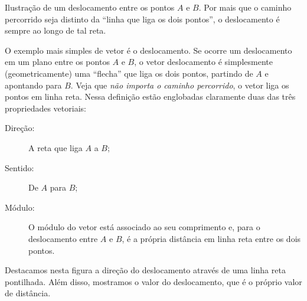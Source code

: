 \begin{marginfigure}
\centering
{}
\caption{Ilustração de um deslocamento entre os pontos $A$ e $B$. Por mais que o caminho percorrido seja distinto da ``linha que liga os dois pontos'', o deslocamento é sempre ao longo de tal reta.}
\end{marginfigure}

O exemplo mais simples de vetor é o deslocamento. Se ocorre um deslocamento em um plano entre os pontos $A$ e $B$, o vetor deslocamento é simplesmente (geometricamente) uma ``flecha'' que liga os dois pontos, partindo de $A$ e apontando para $B$. Veja que \emph{não importa o caminho percorrido}, o vetor liga os pontos em linha reta. Nessa definição estão englobadas claramente duas das três propriedades vetoriais:
\begin{description}
    \item[Direção:] A reta que liga $A$ a $B$;
    \item[Sentido:] De $A$ para $B$;
    \item[Módulo:] O módulo do vetor está associado ao seu comprimento e, para o deslocamento entre $A$ e $B$, é a própria distância em linha reta entre os dois pontos.
\end{description}

\begin{marginfigure}
\centering
{}
\caption{Destacamos nesta figura a direção do deslocamento através de uma linha reta pontilhada. Além disso, mostramos o valor do deslocamento, que é o próprio valor de distância.}
\end{marginfigure}

